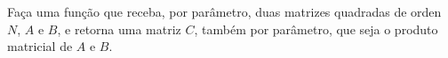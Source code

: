 
\question[10]

Faça uma função que receba, por parâmetro, duas matrizes quadradas de orden $N$, $A$ e $B$, e retorna uma matriz $C$, também por parâmetro, que seja o produto matricial de $A$ e $B$.